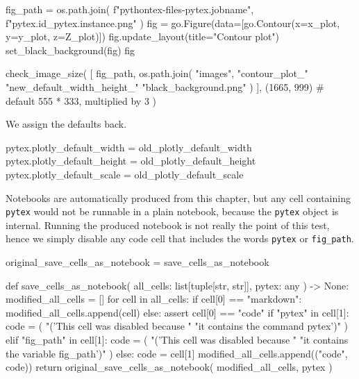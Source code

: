 \documentclass[oneside]{book}
\begin{document}
\begin{pycell}
fig_path = os.path.join(
    f"pythontex-files-{pytex.jobname}",
    f"{pytex.id}_{pytex.instance}.png"
)
fig = go.Figure(data=[go.Contour(x=x_plot, y=y_plot, z=Z_plot)])
fig.update_layout(title="Contour plot")
set_black_background(fig)
fig
\end{pycell}

\begin{pycell}
check_image_size(
    [
        fig_path,
        os.path.join(
            "images",
            "contour_plot_"
            "new_default_width_height_"
            "black_background.png"
        )
    ],
    (1665, 999)  # default 555 * 333, multiplied by 3
)
\end{pycell}

\begin{mdcell}
We assign the defaults back.
\end{mdcell}

\begin{pycell}
pytex.plotly_default_width = old_plotly_default_width
pytex.plotly_default_height = old_plotly_default_height
pytex.plotly_default_scale = old_plotly_default_scale
\end{pycell}

Notebooks are automatically produced from this chapter, but any cell containing \texttt{pytex} would not be runnable in a plain notebook, because the \texttt{pytex} object is internal. Running the produced notebook is not really the point of this test, hence we simply disable any code cell that includes the words \texttt{pytex} or \texttt{fig\_path}.

\begin{pycell}
original_save_cells_as_notebook = save_cells_as_notebook

def save_cells_as_notebook(
    all_cells: list[tuple[str, str]], pytex: any
) -> None:
    modified_all_cells = []
    for cell in all_cells:
        if cell[0] == "markdown":
            modified_all_cells.append(cell)
        else:
            assert cell[0] == "code"
            if "pytex" in cell[1]:
                code = (
                    "\nprint('This cell was disabled because "
                    "it contains the command pytex')"
                )
            elif "fig_path" in cell[1]:
                code = (
                    "\nprint('This cell was disabled because "
                    "it contains the variable fig_path')"
                )
            else:
                code = cell[1]
            modified_all_cells.append(("code", code))
    return original_save_cells_as_notebook(
        modified_all_cells, pytex
    )
\end{pycell}
\end{document}

